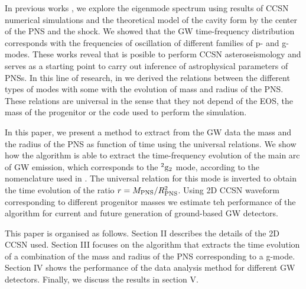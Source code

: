 \cite{kokkotas, Friedman:2013} In previous works \cite{Torres:2018, Torres:2019a}, we explore the eigenmode spectrum using results of CCSN numerical simulations and the theoretical model of the cavity form by the center of the PNS and the shock. We showed that the GW time-frequency distribution corresponds with the frequencies of oscillation of different families of p- and g-modes. These works reveal that is posible to perform CCSN asteroseismology and serves as a starting point to carry out inference of astrophysical parameters of PNSs. In this line of research, in \cite{Torres:2019b} we derived the relations between the different types of modes with some with the evolution of mass and radius of the PNS. These relations are universal in the sense that they not depend of the EOS, the mass of the progenitor or the code used to perform the simulation. 

In this paper, we present a method to extract from the GW data the mass and the radius of the PNS as function of time using the universal relations. We show how the algorithm is able to extract the time-frequency evolution of the main arc of GW emission, which corresponds to the $^2\rm{g}_2$ mode, according to the nomenclature used in \cite{Torres:2019b}. The universal relation for this mode is inverted to obtain the time evolution of the ratio $r=M_{\rm PNS}/R_{\rm PNS}^2$. Using 2D CCSN waveform corresponding to different progenitor masses we estimate teh performance of the algorithm for current and future generation of ground-based GW detectors.

This paper is organised as follows. Section II describes the details of the 2D CCSN used. Section III focuses on the algorithm that extracts the time evolution of a combination of the mass and radius of the PNS corresponding to a g-mode. Section IV shows the performance of the data analysis method for different GW detectors. Finally, we discuss the results in section V.


